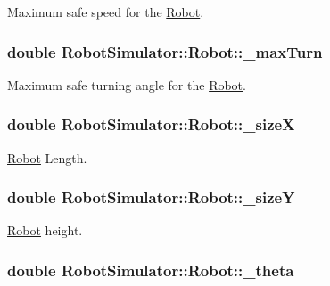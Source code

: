 Maximum safe speed for the \hyperlink{structRobotSimulator_1_1Robot}{Robot}. \hypertarget{structRobotSimulator_1_1Robot_af9967fd4b2e74e67e5b9d3bc45fd30d3}{
\subsubsection[{\-\_\-max\-Turn}]{\setlength{\rightskip}{0pt plus 5cm}double Robot\-Simulator\-::\-Robot\-::\-\_\-max\-Turn}}\label{structRobotSimulator_1_1Robot_af9967fd4b2e74e67e5b9d3bc45fd30d3}
Maximum safe turning angle for the \hyperlink{structRobotSimulator_1_1Robot}{Robot}. \hypertarget{structRobotSimulator_1_1Robot_afc7eddc29b81662393361dc8ca24806a}{
\subsubsection[{\-\_\-size\-X}]{\setlength{\rightskip}{0pt plus 5cm}double Robot\-Simulator\-::\-Robot\-::\-\_\-size\-X}}\label{structRobotSimulator_1_1Robot_afc7eddc29b81662393361dc8ca24806a}
\hyperlink{structRobotSimulator_1_1Robot}{Robot} Length. \hypertarget{structRobotSimulator_1_1Robot_a15d2779576df86d973c42c12c1f3c2ba}{
\subsubsection[{\-\_\-size\-Y}]{\setlength{\rightskip}{0pt plus 5cm}double Robot\-Simulator\-::\-Robot\-::\-\_\-size\-Y}}\label{structRobotSimulator_1_1Robot_a15d2779576df86d973c42c12c1f3c2ba}
\hyperlink{structRobotSimulator_1_1Robot}{Robot} height. \hypertarget{structRobotSimulator_1_1Robot_a9c91ff0ff4514da0c9cd56f45064032e}{
\subsubsection[{\-\_\-theta}]{\setlength{\rightskip}{0pt plus 5cm}double Robot\-Simulator\-::\-Robot\-::\-\_\-theta}}\label{structRobotSimulator_1_1Robot_a9c91ff0ff4514da0c9cd56f45064032e}

